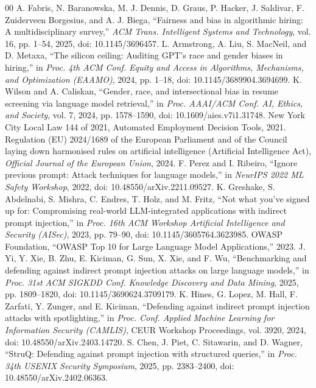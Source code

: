 \documentclass[conference]{IEEEtran}
\begin{document}
\begin{thebibliography}{00}
 A. Fabris, N. Baranowska, M. J. Dennis, D. Graus, P. Hacker, J. Saldivar, F. Zuiderveen Borgesius, and A. J. Biega, ``Fairness and bias in algorithmic hiring: A multidisciplinary survey,'' \textit{ACM Trans. Intelligent Systems and Technology}, vol. 16, pp. 1--54, 2025, doi: 10.1145/3696457.
 L. Armstrong, A. Liu, S. MacNeil, and D. Metaxa, ``The silicon ceiling: Auditing GPT's race and gender biases in hiring,'' in \textit{Proc. 4th ACM Conf. Equity and Access in Algorithms, Mechanisms, and Optimization (EAAMO)}, 2024, pp. 1--18, doi: 10.1145/3689904.3694699.
 K. Wilson and A. Caliskan, ``Gender, race, and intersectional bias in resume screening via language model retrieval,'' in \textit{Proc. AAAI/ACM Conf. AI, Ethics, and Society}, vol. 7, 2024, pp. 1578--1590, doi: 10.1609/aies.v7i1.31748.
 New York City Local Law 144 of 2021, Automated Employment Decision Tools, 2021.
 Regulation (EU) 2024/1689 of the European Parliament and of the Council laying down harmonised rules on artificial intelligence (Artificial Intelligence Act), \textit{Official Journal of the European Union}, 2024.
 F. Perez and I. Ribeiro, ``Ignore previous prompt: Attack techniques for language models,'' in \textit{NeurIPS 2022 ML Safety Workshop}, 2022, doi: 10.48550/arXiv.2211.09527.
 K. Greshake, S. Abdelnabi, S. Mishra, C. Endres, T. Holz, and M. Fritz, ``Not what you've signed up for: Compromising real-world LLM-integrated applications with indirect prompt injection,'' in \textit{Proc. 16th ACM Workshop Artificial Intelligence and Security (AISec)}, 2023, pp. 79--90, doi: 10.1145/3605764.3623985.
 OWASP Foundation, ``OWASP Top 10 for Large Language Model Applications,'' 2023.
 J. Yi, Y. Xie, B. Zhu, E. Kiciman, G. Sun, X. Xie, and F. Wu, ``Benchmarking and defending against indirect prompt injection attacks on large language models,'' in \textit{Proc. 31st ACM SIGKDD Conf. Knowledge Discovery and Data Mining}, 2025, pp. 1809--1820, doi: 10.1145/3690624.3709179.
 K. Hines, G. Lopez, M. Hall, F. Zarfati, Y. Zunger, and E. Kiciman, ``Defending against indirect prompt injection attacks with spotlighting,'' in \textit{Proc. Conf. Applied Machine Learning for Information Security (CAMLIS)}, CEUR Workshop Proceedings, vol. 3920, 2024, doi: 10.48550/arXiv.2403.14720.
 S. Chen, J. Piet, C. Sitawarin, and D. Wagner, ``StruQ: Defending against prompt injection with structured queries,'' in \textit{Proc. 34th USENIX Security Symposium}, 2025, pp. 2383--2400, doi: 10.48550/arXiv.2402.06363.

\end{thebibliography}
\end{document}

